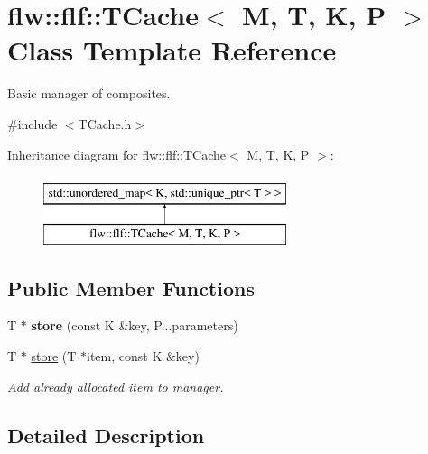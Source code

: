 \hypertarget{classflw_1_1flf_1_1TCache}{}\section{flw\+:\+:flf\+:\+:T\+Cache$<$ M, T, K, P $>$ Class Template Reference}
\label{classflw_1_1flf_1_1TCache}


Basic manager of composites.  




{\ttfamily \#include $<$T\+Cache.\+h$>$}

Inheritance diagram for flw\+:\+:flf\+:\+:T\+Cache$<$ M, T, K, P $>$\+:\begin{figure}[H]
\begin{center}
\leavevmode
\includegraphics[height=2.000000cm]{classflw_1_1flf_1_1TCache}
\end{center}
\end{figure}
\subsection*{Public Member Functions}
\begin{DoxyCompactItemize}
\item 
T $\ast$ {\bfseries store} (const K \&key, P...\+parameters)\hypertarget{classflw_1_1flf_1_1TCache_aa384a2c35d402c32e27ca45f79fa0512}{}\label{classflw_1_1flf_1_1TCache_aa384a2c35d402c32e27ca45f79fa0512}

\item 
T $\ast$ \hyperlink{classflw_1_1flf_1_1TCache_a6076917fba41b9e16ffd24dc95c16865}{store} (T $\ast$item, const K \&key)\hypertarget{classflw_1_1flf_1_1TCache_a6076917fba41b9e16ffd24dc95c16865}{}\label{classflw_1_1flf_1_1TCache_a6076917fba41b9e16ffd24dc95c16865}

\begin{DoxyCompactList}\small\item\em Add already allocated item to manager. \end{DoxyCompactList}\end{DoxyCompactItemize}


\subsection{Detailed Description}
